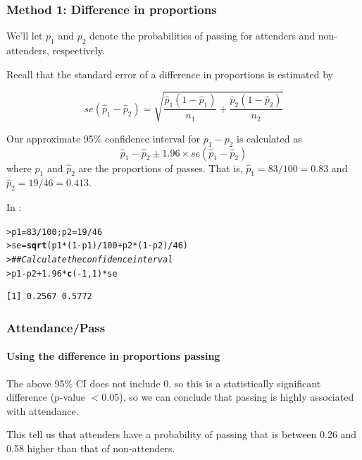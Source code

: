 \documentclass{beamer}\usepackage[]{graphicx}\usepackage[]{xcolor}
\makeatletter
\newcommand{\hlnum}[1]{\textcolor[rgb]{0.686,0.059,0.569}{#1}}%
\newcommand{\hlcom}[1]{\textcolor[rgb]{0.678,0.584,0.686}{\textit{#1}}}%
\newcommand{\hlopt}[1]{\textcolor[rgb]{0,0,0}{#1}}%
\newcommand{\hlstd}[1]{\textcolor[rgb]{0.345,0.345,0.345}{#1}}%
\newcommand{\hlkwb}[1]{\textcolor[rgb]{0.69,0.353,0.396}{#1}}%
\newcommand{\hlkwd}[1]{\textcolor[rgb]{0.737,0.353,0.396}{\textbf{#1}}}%
\newenvironment{kframe}{%
 \def\at@end@of@kframe{}%
 \ifinner\ifhmode%
  \def\at@end@of@kframe{\end{minipage}}%
  \begin{minipage}{\columnwidth}%
 \fi\fi%
 \def\FrameCommand##1{\hskip\@totalleftmargin \hskip-\fboxsep
 \colorbox{shadecolor}{##1}\hskip-\fboxsep
     \hskip-\linewidth \hskip-\@totalleftmargin \hskip\columnwidth}%
 \MakeFramed {\advance\hsize-\width
   \@totalleftmargin\z@ \linewidth\hsize
   \@setminipage}}%
 {\par\unskip\endMakeFramed%
 \at@end@of@kframe}
\newenvironment{knitrout}{}{} %
\makeatother
\begin{document}
\begin{frame}[fragile]
\frametitle{Method 1: Difference in proportions}
We'll let $p_1$ and $p_2$ denote the probabilities of passing for attenders and
non-attenders, respectively.
\medskip

Recall that the standard error of a difference in proportions is estimated by

\[ se(\hat{p}_1-\hat{p}_2) =
     \sqrt{\frac{\hat{p}_1(1-\hat{p}_1)}{n_1}+\frac{\hat{p}_2(1-\hat{p}_2)}{n_2}}  \]

Our approximate 95\% confidence interval for $p_1-p_2$ is calculated as
\[ \hat{p}_1-\hat{p}_2 \pm 1.96 \times se(\hat{p}_1-\hat{p}_2) \]
where $\hat{p}_1$ and $\hat{p}_2$ are the proportions of passes.
That is, $\hat{p}_1=83/100=0.83$ and $\hat{p}_2=19/46=0.413$.

\medskip

In :

\begin{knitrout}\scriptsize
{}\color{fgcolor}\begin{kframe}
\begin{alltt}
\hlstd{> }\hlstd{p1} \hlkwb{=} \hlnum{83}\hlopt{/}\hlnum{100}\hlstd{; p2} \hlkwb{=} \hlnum{19}\hlopt{/}\hlnum{46}
\hlstd{> }\hlstd{se} \hlkwb{=} \hlkwd{sqrt}\hlstd{(p1} \hlopt{*} \hlstd{(}\hlnum{1} \hlopt{-} \hlstd{p1)}\hlopt{/}\hlnum{100} \hlopt{+} \hlstd{p2} \hlopt{*} \hlstd{(}\hlnum{1} \hlopt{-} \hlstd{p2)}\hlopt{/}\hlnum{46}\hlstd{)}
\hlstd{> }\hlcom{## Calculate the confidence interval}
\hlstd{> }\hlstd{p1} \hlopt{-} \hlstd{p2} \hlopt{+} \hlnum{1.96} \hlopt{*} \hlkwd{c}\hlstd{(}\hlopt{-}\hlnum{1}\hlstd{,} \hlnum{1}\hlstd{)} \hlopt{*} \hlstd{se}
\end{alltt}
\begin{verbatim}
[1] 0.2567 0.5772
\end{verbatim}
\end{kframe}
\end{knitrout}
\end{frame}


\begin{frame}[fragile]
\frametitle{Attendance/Pass}
\framesubtitle{Using the difference in proportions passing}
The above 95\% CI does not include 0, so this is a statistically significant
difference (p-value $<0.05$),
so we can conclude that passing is highly associated with attendance.
\bigskip

This tell us that attenders have a probability of passing that is between 0.26 and 0.58 higher than that of non-attenders.

\end{frame}
\end{document}
